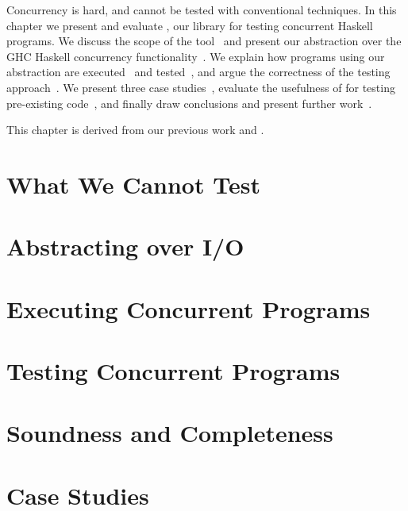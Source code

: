 \chapstart Concurrency is hard, and cannot be tested with conventional
techniques.  In this chapter we present and evaluate \dejafu{}, our library for
testing concurrent Haskell programs.  We discuss the scope of the
tool~ and present our abstraction over the GHC Haskell
concurrency functionality~.  We explain how programs
using our abstraction are executed~ and
tested~, and argue the correctness of the testing
approach~.  We present three case
studies~, evaluate the usefulness of \dejafu{} for
testing pre-existing code~, and finally draw conclusions
and present further work~.

This chapter is derived from our previous work \cite{walker2015} and
\cite{YCS-2016-503}.

\section{What We Cannot Test}
\label{sec:dejafu-scope}

\blindtext

\section{Abstracting over I/O}
\label{sec:dejafu-monadconc}

\blindtext

\section{Executing Concurrent Programs}
\label{sec:dejafu-execution}

\blindtext

\section{Testing Concurrent Programs}
\label{sec:dejafu-testing}

\blindtext

\section{Soundness and Completeness}
\label{sec:dejafu-correctness}

\blindtext

\section{Case Studies}
\label{sec:dejafu-casestudies}

